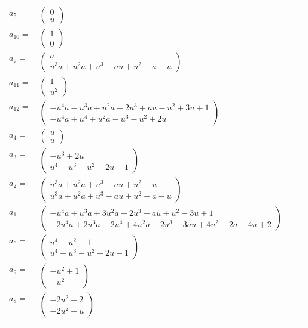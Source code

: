 \documentclass[1p]{elsarticle_modified}
\theoremstyle{definition}
\begin{document}
\begin{tabular}{m{7pt} m{180pt} m{7pt} m{180pt} }
\flushright $a_{5}=$&$\begin{pmatrix}0\\u\end{pmatrix}$ \\
\flushright $a_{10}=$&$\begin{pmatrix}1\\0\end{pmatrix}$ \\
\flushright $a_{7}=$&$\begin{pmatrix}a\\u^3 a+u^2 a+u^3- a u+u^2+a- u\end{pmatrix}$ \\
\flushright $a_{11}=$&$\begin{pmatrix}1\\u^2\end{pmatrix}$ \\
\flushright $a_{12}=$&$\begin{pmatrix}- u^4 a- u^3 a+u^2 a-2 u^3+a u- u^2+3 u+1\\- u^4 a+u^4+u^2 a- u^3- u^2+2 u\end{pmatrix}$ \\
\flushright $a_{4}=$&$\begin{pmatrix}u\\u\end{pmatrix}$ \\
\flushright $a_{3}=$&$\begin{pmatrix}- u^3+2 u\\u^4- u^3- u^2+2 u-1\end{pmatrix}$ \\
\flushright $a_{2}=$&$\begin{pmatrix}u^3 a+u^2 a+u^3- a u+u^2- u\\u^3 a+u^2 a+u^3- a u+u^2+a- u\end{pmatrix}$ \\
\flushright $a_{1}=$&$\begin{pmatrix}- u^4 a+u^3 a+3 u^2 a+2 u^3- a u+u^2-3 u+1\\-2 u^4 a+2 u^3 a-2 u^4+4 u^2 a+2 u^3-3 a u+4 u^2+2 a-4 u+2\end{pmatrix}$ \\
\flushright $a_{6}=$&$\begin{pmatrix}u^4- u^2-1\\u^4- u^3- u^2+2 u-1\end{pmatrix}$ \\
\flushright $a_{9}=$&$\begin{pmatrix}- u^2+1\\- u^2\end{pmatrix}$ \\
\flushright $a_{8}=$&$\begin{pmatrix}-2 u^2+2\\-2 u^2+u\end{pmatrix}$\\&\end{tabular}
\end{document}
